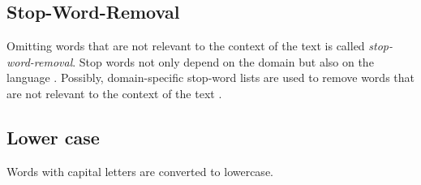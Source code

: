 \subsection{Stop-Word-Removal}\label{subsec:stop-word-removal}

Omitting words that are not relevant to the context of the text is called \textit{stop-word-removal}.
Stop words not only depend on the domain but also on the language \cite{IR2011}.
Possibly, domain-specific stop-word lists are used to remove words that are not relevant to the context of the text \cite{IR2011}.



\subsection{Lower case}\label{subsec:lower-case}

Words with capital letters are converted to lowercase.
